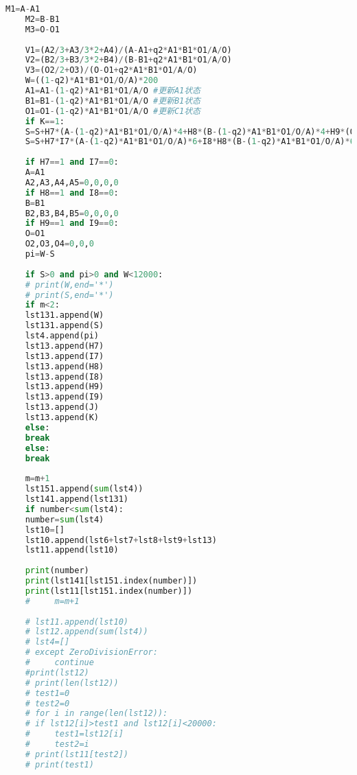 \documentclass[withoutpreface,bwprint]{cumcmthesis} %
\begin{document}
\begin{lstlisting}[language=python]
 	M1=A-A1
 	M2=B-B1
 	M3=O-O1
 	
 	V1=(A2/3+A3/3*2+A4)/(A-A1+q2*A1*B1*O1/A/O)
 	V2=(B2/3+B3/3*2+B4)/(B-B1+q2*A1*B1*O1/A/O)
 	V3=(O2/2+O3)/(O-O1+q2*A1*B1*O1/A/O)
 	W=((1-q2)*A1*B1*O1/O/A)*200
 	A1=A1-(1-q2)*A1*B1*O1/A/O #更新A1状态
 	B1=B1-(1-q2)*A1*B1*O1/A/O #更新B1状态
 	O1=O1-(1-q2)*A1*B1*O1/A/O #更新C1状态
 	if K==1:
 	S=S+H7*(A-(1-q2)*A1*B1*O1/O/A)*4+H8*(B-(1-q2)*A1*B1*O1/O/A)*4+H9*(O-(1-q2)*A1*B1*O1/O/A)*4
 	S=S+H7*I7*(A-(1-q2)*A1*B1*O1/O/A)*6+I8*H8*(B-(1-q2)*A1*B1*O1/O/A)*6+I9*H9*(O-(1-q2)*A1*B1*O1/O/A)*6
 	
 	if H7==1 and I7==0:
 	A=A1
 	A2,A3,A4,A5=0,0,0,0
 	if H8==1 and I8==0:
 	B=B1
 	B2,B3,B4,B5=0,0,0,0
 	if H9==1 and I9==0:
 	O=O1
 	O2,O3,O4=0,0,0
 	pi=W-S
 	
 	if S>0 and pi>0 and W<12000:
 	# print(W,end='*')
 	# print(S,end='*')
 	if m<2:
 	lst131.append(W)
 	lst131.append(S)
 	lst4.append(pi)
 	lst13.append(H7)
 	lst13.append(I7)
 	lst13.append(H8)
 	lst13.append(I8)
 	lst13.append(H9)
 	lst13.append(I9)
 	lst13.append(J)
 	lst13.append(K)
 	else:
 	break 
 	else:
 	break
 	
 	m=m+1
 	lst151.append(sum(lst4))
 	lst141.append(lst131)
 	if number<sum(lst4):
 	number=sum(lst4)
 	lst10=[]
 	lst10.append(lst6+lst7+lst8+lst9+lst13)
 	lst11.append(lst10)
 	
 	print(number)
 	print(lst141[lst151.index(number)])
 	print(lst11[lst151.index(number)])
 	#     m=m+1
 	
 	# lst11.append(lst10)
 	# lst12.append(sum(lst4)) 
 	# lst4=[]
 	# except ZeroDivisionError:
 	#     continue
 	#print(lst12)
 	# print(len(lst12))
 	# test1=0
 	# test2=0
 	# for i in range(len(lst12)):
 	# if lst12[i]>test1 and lst12[i]<20000:
 	#     test1=lst12[i]
 	#     test2=i
 	# print(lst11[test2])
 	# print(test1)
 \end{lstlisting}
 
\end{document}
